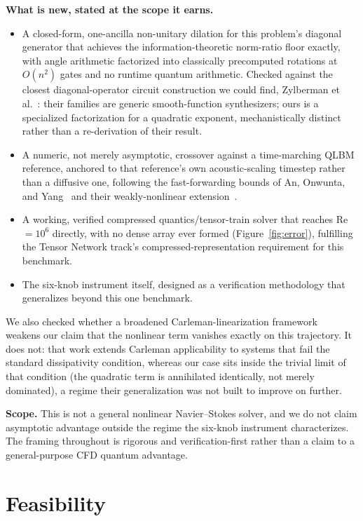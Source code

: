 \documentclass[10.5pt,twocolumn]{article}
\begin{document}
\textbf{What is new, stated at the scope it earns.}
\begin{itemize}[leftmargin=1.4em, itemsep=0.2em]
\item A closed-form, one-ancilla non-unitary dilation for this problem's diagonal generator that achieves the information-theoretic norm-ratio floor exactly, with angle arithmetic factorized into classically precomputed rotations at $O(n^2)$ gates and no runtime quantum arithmetic. Checked against the closest diagonal-operator circuit construction we could find, Zylberman et al.~\cite{zylberman2024}: their families are generic smooth-function synthesizers; ours is a specialized factorization for a quadratic exponent, mechanistically distinct rather than a re-derivation of their result.
\item A numeric, not merely asymptotic, crossover against a time-marching QLBM reference, anchored to that reference's own acoustic-scaling timestep rather than a diffusive one, following the fast-forwarding bounds of An, Onwunta, and Yang~\cite{an2026} and their weakly-nonlinear extension~\cite{yang2026}.
\item A working, verified compressed quantics/tensor-train solver that reaches Re~$=10^6$ directly, with no dense array ever formed (Figure~\ref{fig:error}), fulfilling the Tensor Network track's compressed-representation requirement for this benchmark.
\item The six-knob instrument itself, designed as a verification methodology that generalizes beyond this one benchmark.
\end{itemize}

We also checked whether a broadened Carleman-linearization framework~\cite{wang2026} weakens our claim that the nonlinear term vanishes exactly on this trajectory. It does not: that work extends Carleman applicability to systems that fail the standard dissipativity condition, whereas our case sits inside the trivial limit of that condition (the quadratic term is annihilated identically, not merely dominated), a regime their generalization was not built to improve on further.

\textbf{Scope.} This is not a general nonlinear Navier--Stokes solver, and we do not claim asymptotic advantage outside the regime the six-knob instrument characterizes. The framing throughout is rigorous and verification-first rather than a claim to a general-purpose CFD quantum advantage.

\section{Feasibility}
\end{document}
